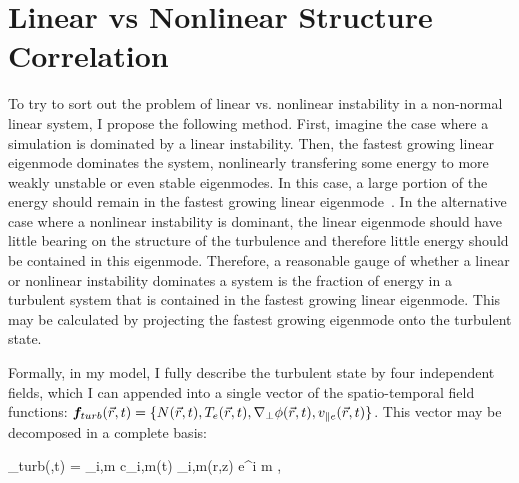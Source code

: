 \section{Linear vs Nonlinear Structure Correlation}
\label{s_lin_vs_nlin_struc}

To try to sort out the problem of linear vs. nonlinear instability in a non-normal linear system, I propose the following method.
First, imagine the case where a simulation is dominated by a linear instability. Then, the fastest growing linear
eigenmode dominates the system, nonlinearly transfering some energy to more weakly unstable or even stable eigenmodes. In this case, a large portion of the energy should remain in the fastest
growing linear eigenmode~\cite{hatch2011}. In the alternative case where a nonlinear instability is dominant, 
the linear eigenmode should have little bearing on the structure of the turbulence and therefore little
energy should be contained in this eigenmode. Therefore, a reasonable gauge of whether a linear or nonlinear instability dominates a system is the fraction of energy in a turbulent system
that is contained in the fastest growing linear eigenmode. This may be calculated by projecting the fastest growing eigenmode onto the turbulent state.

Formally, in my model, I fully describe the turbulent state by four independent fields, which I can appended into a single vector of the spatio-temporal field functions: 
$\bm{f}_{turb}(\vec{r},t) = \{N(\vec{r},t),T_e(\vec{r},t),\nabla_\perp \phi(\vec{r},t), v_{\parallel e}(\vec{r},t)\}$. This vector may be decomposed in a complete basis:

\beq
\label{basis_decomp}
_{turb}(,t) = \sum_{i,m} c_{i,m}(t) \bm{\psi}_{i,m}(r,z) e^{i m \theta},
\eeq

